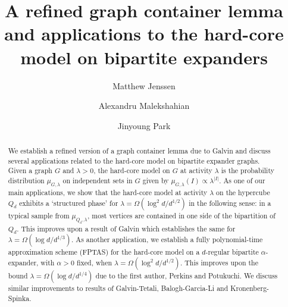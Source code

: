 \documentclass[a4paper]{amsart}
\theoremstyle{definition}
\newcommand{\0}[0]{\emptyset}
\newcommand{\lam}{\lambda}
\begin{document}
\title{A refined graph container lemma and applications to the hard-core model on bipartite expanders}

\author[M. Jenssen]{Matthew Jenssen}
\address{Department of Mathematics, King's College London}
\author[A. Malekshahian]{Alexandru Malekshahian}
\address{Mathematical Institute, University of Oxford}
\author[J. Park]{Jinyoung Park}
\address{Department of Mathematics, Courant Institute of Mathematical Sciences, New York University}

\begin{abstract}
    We establish a refined version of a graph container lemma due to Galvin and discuss several applications related to the hard-core model on bipartite expander graphs.  Given a graph $G$ and $\lam>0$, the hard-core model on $G$ at activity $\lambda$ is the probability distribution $\mu_{G,\lam}$ on independent sets in $G$ given by $\mu_{G,\lam}(I)\propto \lam^{|I|}$. As one of our main applications, we show that the hard-core model at activity $\lambda$ on the hypercube $Q_d$ exhibits a `structured phase' for $\lambda= \Omega( \log^2 d/d^{1/2})$ in the following sense: in a typical sample from $\mu_{Q_d,\lam}$, most vertices are contained in one side of the bipartition of $Q_d$. This improves upon a result of Galvin which establishes the same for $\lam=\Omega(\log d/ d^{1/3})$. As another application, we establish a fully polynomial-time approximation scheme (FPTAS) for the hard-core model on a $d$-regular bipartite $\alpha$-expander, with $\alpha>0$ fixed, when $\lambda= \Omega( \log^2 d/d^{1/2})$. This improves upon the bound $\lam=\Omega(\log d/ d^{1/4})$ due to the first author, Perkins and Potukuchi. 
     We discuss similar improvements to results of Galvin-Tetali, Balogh-Garcia-Li and Kronenberg-Spinka. 
\end{abstract}

\maketitle
\end{document}
